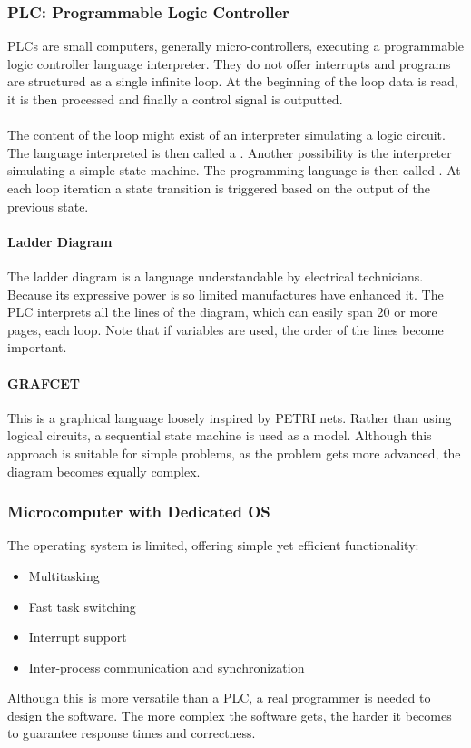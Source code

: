 \documentclass[../main.tex]{subfiles}
\begin{document}
\subsubsection{PLC: Programmable Logic Controller}
PLCs are small computers, generally micro-controllers, executing a programmable logic controller language interpreter. They do not offer interrupts and programs are structured as a single infinite loop. At the beginning of the loop data is read, it is then processed and finally a control signal is outputted.
\\\\
The content of the loop might exist of an interpreter simulating a logic circuit. The language interpreted is then called a . Another possibility is the interpreter simulating a simple state machine. The programming language is then called . At each loop iteration a state transition is triggered based on the output of the previous state.

\paragraph{Ladder Diagram} 
The ladder diagram is a language understandable by electrical technicians. Because its expressive power is so limited manufactures have enhanced it. The PLC interprets all the lines of the diagram, which can easily span 20 or more pages, each loop. Note that if variables are used, the order of the lines become important.  

\paragraph{GRAFCET} This is a graphical language loosely inspired by PETRI nets. Rather than using logical circuits, a sequential state machine is used as a model. Although this approach is suitable for simple problems, as the problem gets more advanced, the diagram becomes equally complex.

\subsubsection{Microcomputer with Dedicated OS}
The operating system is limited, offering simple yet efficient functionality:
\begin{itemize}
	\item Multitasking
	\item Fast task switching
	\item Interrupt support
	\item Inter-process communication and synchronization
\end{itemize}
Although this is more versatile than a PLC, a real programmer is needed to design the software. The more complex the software gets, the harder it becomes to guarantee response times and correctness.
\end{document}
